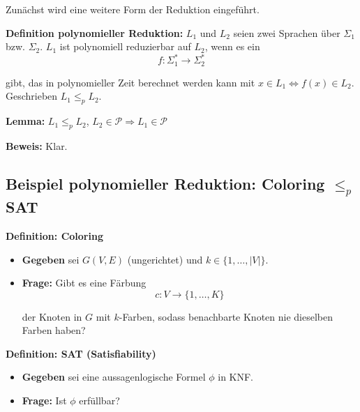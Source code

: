 \documentclass{scrartcl}%
\begin{document}
    Zunächst wird eine weitere Form der Reduktion eingeführt.

    \vspace*{0.3cm}
    \textbf{\textsf{Definition polynomieller Reduktion:}} $L_1$ und $L_2$ seien zwei Sprachen über $\Sigma_1$ bzw. $\Sigma_2$.
    \newline $L_1$ ist polynomiell reduzierbar auf $L_2$, wenn es ein
    \begin{equation*}
        f : \Sigma_{1}^* \rightarrow \Sigma_{2}^*
    \end{equation*}

    gibt, das in polynomieller Zeit berechnet werden kann mit $x \in L_1 \Leftrightarrow f(x) \in L_2$. \newline Geschrieben
    $L_1 \leq_p L_2$.

    \textbf{\textsf{Lemma:}} $L_1 \leq_p L_2$, $L_2 \in \mathcal{P} \Rightarrow L_1 \in \mathcal{P}$

    \vspace*{0.3cm}
    \textbf{\textsf{Beweis:}} Klar.

    \subsection*{Beispiel polynomieller Reduktion: Coloring $\leq_p$ SAT}

    \vspace*{0.3cm}
    \textbf{\textsf{Definition: Coloring}}
    \begin{itemize}
        \item [] \textbf{\textsf{Gegeben}} sei $G(V,E)$  (ungerichtet) und $k \in \{1, \dots, |V|\}$.
        \item [] {\textbf{\textsf{Frage:}} Gibt es eine Färbung
        \begin{equation*}
            c : V \rightarrow \{1, \dots, K\}
        \end{equation*}

        der Knoten in $G$ mit $k$-Farben, sodass benachbarte Knoten nie dieselben Farben haben?
        }
    \end{itemize}

    \vspace*{0.3cm}
    \textbf{\textsf{Definition: SAT (Satisfiability)}}
    \begin{itemize}
        \item [] \textbf{\textsf{Gegeben}} sei eine aussagenlogische Formel $\phi$ in KNF.
        \item [] {\textbf{\textsf{Frage:}} Ist $\phi$ erfüllbar?
        }
    \end{itemize}
\end{document}
